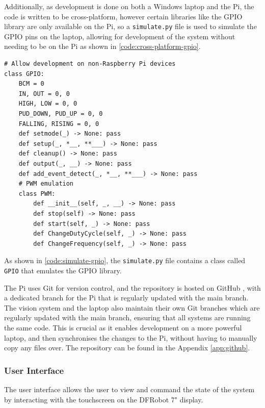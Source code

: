 Additionally, as development is done on both a Windows laptop and the Pi, the code is written to be cross-platform, however certain libraries like the GPIO library are only available on the Pi, so a \texttt{simulate.py} file is used to simulate the GPIO pins on the laptop, allowing for development of the system without needing to be on the Pi as shown in \autoref{code:cross-platform-gpio}.

\begin{minipage}[H]{\textwidth}
    \centering
    \begin{verbatim}
# Allow development on non-Raspberry Pi devices
class GPIO:
    BCM = 0
    IN, OUT = 0, 0
    HIGH, LOW = 0, 0
    PUD_DOWN, PUD_UP = 0, 0
    FALLING, RISING = 0, 0
    def setmode(_) -> None: pass
    def setup(_, *__, **___) -> None: pass
    def cleanup() -> None: pass
    def output(_, __) -> None: pass
    def add_event_detect(_, *__, **___) -> None: pass
    # PWM emulation
    class PWM:
        def __init__(self, _, __) -> None: pass
        def stop(self) -> None: pass
        def start(self, _) -> None: pass
        def ChangeDutyCycle(self, _) -> None: pass
        def ChangeFrequency(self, _) -> None: pass
    \end{verbatim}
    \label{code:simulate-gpio}
\end{minipage}

As shown in \autoref{code:simulate-gpio}, the \texttt{simulate.py} file contains a class called \texttt{GPIO} that emulates the GPIO library.

The Pi uses Git \cite{git} for version control, and the repository is hosted on GitHub \cite{github}, with a dedicated branch for the Pi that is regularly updated with the main branch. The vision system and the laptop also maintain their own Git branches which are regularly updated with the main branch, ensuring that all systems are running the same code. This is crucial as it enables development on a more powerful laptop, and then synchronises the changes to the Pi, without having to manually copy any files over. The repository can be found in the Appendix \ref{app:github}.
\subsubsection{User Interface}
The user interface allows the user to view and command the state of the system by interacting with the touchscreen on the DFRobot 7" display. 

